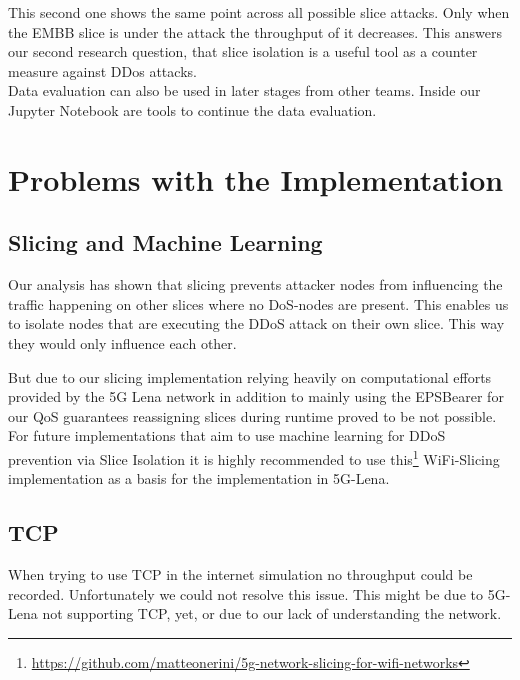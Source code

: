     This second one shows the same point across all possible slice attacks. Only when the EMBB slice is under the attack the throughput of it decreases. This answers our second research question, that slice isolation is a useful tool as a counter measure against DDos attacks.\\
    Data evaluation can also be used in later stages from other teams. Inside our Jupyter Notebook are tools to continue the data evaluation.
    
\section{Problems with the Implementation}
    \subsection{Slicing and Machine Learning}
    Our analysis has shown that slicing prevents attacker nodes from influencing the traffic happening on other slices where no DoS-nodes are present. This enables us to isolate nodes that are executing the DDoS attack on their own slice. This way they would only influence each other.
    
    But due to our slicing implementation relying heavily on computational efforts provided by the 5G Lena network in addition to mainly using the EPSBearer for our QoS guarantees reassigning slices during runtime proved to be not possible. 
    For future implementations that aim to use machine learning for DDoS prevention via Slice Isolation it is highly recommended to use this\footnote[7]{\url{https://github.com/matteonerini/5g-network-slicing-for-wifi-networks}} WiFi-Slicing implementation as a basis for the implementation in 5G-Lena.
    
    \subsection{TCP}
    When trying to use TCP in the internet simulation no throughput could be recorded. Unfortunately we could not resolve this issue. This might be due to 5G-Lena not supporting TCP, yet, or due to our lack of understanding the network.